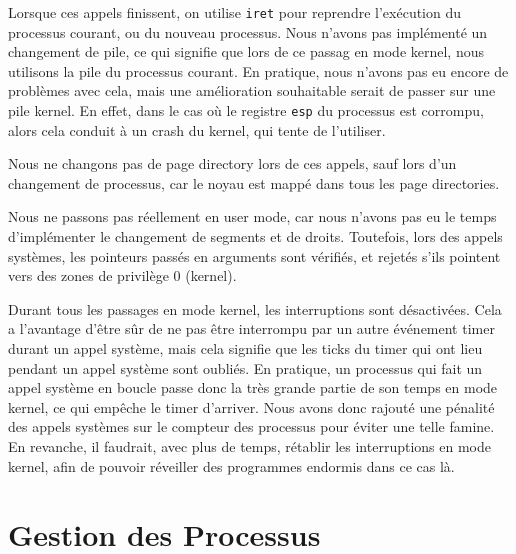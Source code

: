 \documentclass[a4paper,10pt, french]{article}
\newcommand{\code}[1]{\texttt{#1}}
\begin{document}
Lorsque ces appels finissent, on utilise \code{iret} pour reprendre l'exécution du processus courant, ou 
du nouveau processus.
Nous n'avons pas implémenté un changement de pile, ce qui signifie que lors de ce passag en mode kernel,
nous utilisons la pile du processus courant. En pratique, nous n'avons pas eu encore de problèmes avec cela, 
mais une amélioration souhaitable serait de passer sur une pile kernel. En effet, dans le cas où le registre \code{esp}
du processus est corrompu, alors cela conduit à un crash du kernel, qui tente de l'utiliser.

Nous ne changons pas de page directory lors de ces appels, sauf lors d'un changement de processus, car le
noyau est mappé dans tous les page directories.

Nous ne passons pas réellement en user mode, car nous n'avons pas eu le temps d'implémenter le
changement de segments et de droits. Toutefois, lors des appels systèmes, les pointeurs passés en arguments sont vérifiés,
et rejetés s'ils pointent vers des zones de privilège 0 (kernel).

Durant tous les passages en mode kernel, les interruptions sont désactivées. Cela a l'avantage d'être sûr de ne pas être
interrompu par un autre événement timer durant un appel système, mais cela signifie que les ticks du timer qui ont lieu pendant
un appel système sont oubliés. En pratique, un processus qui fait un appel système en boucle passe donc la très grande
partie de son temps en mode kernel, ce qui empêche le timer d'arriver. Nous avons donc rajouté une pénalité des appels
systèmes sur le compteur des processus pour éviter une telle famine. En revanche, il faudrait, avec plus de temps,
rétablir les interruptions en mode kernel, afin de pouvoir réveiller des programmes endormis dans ce cas là.

\section{Gestion des Processus}
\end{document}
